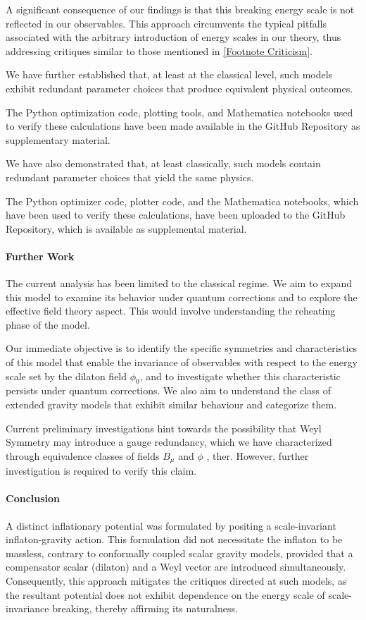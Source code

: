 \documentclass[aps,prd,reprint,preprintnumbers,showpacs,floatfix,nofootinbib,superscript address]{revtex4-2}
\begin{document}
 A significant consequence of our findings is that this breaking energy scale is not reflected in our observables. This approach circumvents the typical pitfalls associated with the arbitrary introduction of energy scales in our theory, thus addressing critiques similar to those mentioned in \cref{Footnote Criticism}. 

We have further established that, at least at the classical level, such models exhibit redundant parameter choices that produce equivalent physical outcomes. 

The Python optimization code, plotting tools, and Mathematica notebooks used to verify these calculations have been made available in the GitHub Repository as supplementary material.

We have also demonstrated that, at least classically, such models contain redundant parameter choices that yield the same physics. 

The Python optimizer code, plotter code, and the Mathematica notebooks, which have been used to verify these calculations, have been uploaded to the GitHub Repository, which is available as supplemental material. 

\paragraph*{Further Work} 
The current analysis has been limited to the classical regime. We aim to expand this model to examine its behavior under quantum corrections and to explore the effective field theory aspect. This would involve understanding the reheating phase of the model.

Our immediate objective is to identify the specific symmetries and characteristics of this model that enable the invariance of observables with respect to the energy scale set by the dilaton field $\phi_0$, and to investigate whether this characteristic persists under quantum corrections. We also aim to understand the class of extended gravity models that exhibit similar behaviour and categorize them.

Current preliminary investigations hint towards the possibility that Weyl Symmetry may introduce a gauge redundancy, which we have characterized through equivalence classes of fields $B_\mu$ and $\phi$ \cite{jackiw_fake_2015, hertzberg_inflation_2015}, ther. However, further investigation is required to verify this claim.

\paragraph*{Conclusion}
A distinct inflationary potential was formulated by positing a scale-invariant inflaton-gravity action. This formulation did not necessitate the inflaton to be massless, contrary to conformally coupled scalar gravity models, provided that a compensator scalar (dilaton) and a Weyl vector are introduced simultaneously. Consequently, this approach mitigates the critiques directed at such models, as the resultant potential does not exhibit dependence on the energy scale of scale-invariance breaking, thereby affirming its naturalness.
\end{document}
